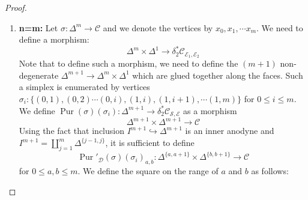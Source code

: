 \documentclass[14pt]{article}
\theoremstyle{definition}
\newcommand{\E}{\mathcal{E}}
\newcommand{\D}{\mathcal{D}}
\newcommand{\op}[1]{\operatorname{#1}}
\renewcommand{\S}{\mathcal{S}}
\newcommand{\dd}{\delta}
\newcommand{\Ca}{\mathcal{C}}
\numberwithin{subsection}{section}
\begin{document}
\begin{proof}
\begin{enumerate}
Such a morphism comprises of two simplicies with the same edge. The two simplicies are defined as follows:
\begin{equation}
    \begin{tikzcd}
       X \arrow[r,equal] \arrow[d,equal] & X \arrow[r,equal] \arrow[d,"f"] & X \arrow[d,"f"] \\
       X \arrow[r,"f"] \arrow[d,equal] & Y \arrow[r,equal] \arrow[d,equal] & Y \arrow[d,equal] \\
       X \arrow[r,"f"] & Y \arrow[r,equal]& Y
    \end{tikzcd} 
\end{equation}
and 
\begin{equation}
\begin{tikzcd}
    X \arrow[r,equal] \arrow[d,equal] & X \arrow[r,equal] \arrow[d,equal] & X \arrow[d,equal]\\
    X \arrow[r,equal] \arrow[d,equal] & X \arrow[d,"f"] \arrow[r,equal] & X \arrow[d,"f"] \\
    X \arrow[r,"f"] & Y \arrow[r,equal] & Y 
    \end{tikzcd}
\end{equation}
\item \textbf{n=m:} Let $\sigma : \Delta^m \to \Ca$ and we denote the vertices by $x_0,x_1,\cdots x_m$. 
We need to define a morphism:
\begin{equation}
    \Delta^m \times \Delta^1 \to \dd^*_2\Ca_{\E_1,\E_2}
\end{equation}
Note that to define such a morphism, we need to define the $(m+1)$ non-degenerate $\Delta^{m+1} \to \Delta^m \times \Delta^1$ which are glued together along the faces. Such a simplex is enumerated by vertices $\sigma_i:\{(0,1),(0,2) \cdots (0,i),(1,i),(1,i+1),\cdots (1,m)\}$ for $0 \le i \le m$.
We define $\op{Pur}(\sigma)(\sigma_i): \Delta^{m+1} \to \dd^*_2\Ca_{\S,\E}$ as a morphism
\begin{equation}
    \Delta^{m+1} \times \Delta^{m+1} \to \Ca
\end{equation}
Using the fact that inclusion $I^{m+1} \hookrightarrow \Delta^{m+1}$ is an inner anodyne and $I^{m+1} = \coprod_{j=1}^{m} \Delta^{\{j-1,j\}}$, it is sufficient to define
\begin{equation}
    \op{Pur}'_{\D}(\sigma)(\sigma_i)_{a,b}:\Delta^{\{a,a+1\}} \times \Delta^{\{b,b+1\}} \to \Ca
\end{equation}
for $0 \leq a,b \leq m$. We define the square on the range of $a$ and $b$ as follows:
\begin{enumerate}

\end{enumerate}
\end{enumerate}
\end{proof}
\end{document}
